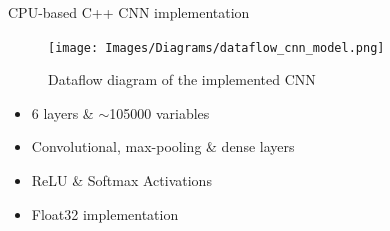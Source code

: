 \begin{frame}{CPU-based C++ CNN implementation}
	\begin{minipage}{0.6\textwidth}
    	\begin{figure}[H]
            \centering
    		\texttt{[image: Images/Diagrams/dataflow\_cnn\_model.png]}
            \caption*{Dataflow diagram of the implemented CNN}
    	\end{figure}%
	\end{minipage}%
	\begin{minipage}{0.4\textwidth}
    	\vspace{1cm}
    	\begin{itemize}
    	    \item 6 layers \& $\sim$105000 variables
    	    \item Convolutional, max-pooling \& dense layers
    	    \item ReLU \& Softmax Activations
    	    \item Float32 implementation
    	\end{itemize}
	\end{minipage}%
\end{frame}

